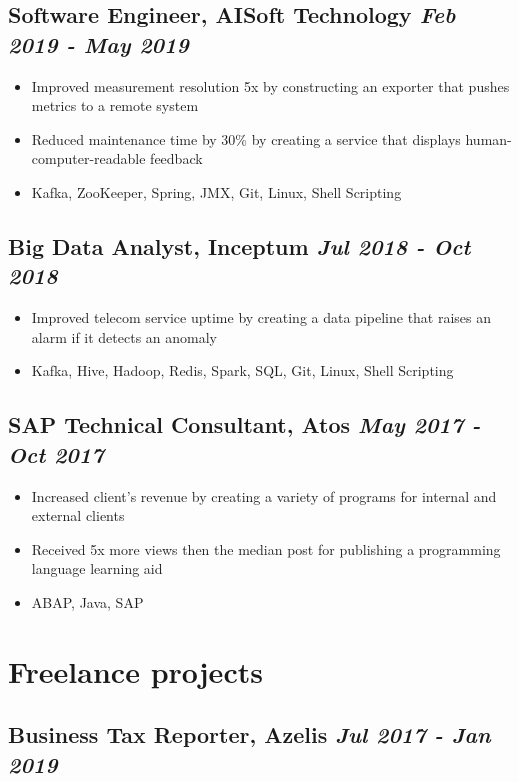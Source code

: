 \documentclass[a4paper]{article}
\newcommand{\bolditalicpair}
[2]
{\textbf{#1} \texorpdfstring{\hfill}{} \textit{#2}}
\begin{document}
\subsection{\bolditalicpair{Software Engineer, AISoft Technology}{Feb 2019 - May 2019}}

\begin{itemize}
  \item Improved measurement resolution 5x by constructing an exporter that pushes metrics to a remote system
  \item Reduced maintenance time by 30\% by creating a service that displays human-computer-readable feedback
  \item Kafka, ZooKeeper, Spring, JMX, Git, Linux, Shell Scripting
\end{itemize}

\subsection{\bolditalicpair{Big Data Analyst, Inceptum}{Jul 2018 - Oct 2018}}

\begin{itemize}
  \item Improved telecom service uptime by creating a data pipeline that raises an alarm if it detects an anomaly
  \item Kafka, Hive, Hadoop, Redis, Spark, SQL, Git, Linux, Shell Scripting
\end{itemize}

\subsection{\bolditalicpair{SAP Technical Consultant, Atos}{May 2017 - Oct 2017}}

\begin{itemize}
  \item Increased client's revenue by creating a variety of programs for internal and external clients
  \item Received 5x more views then the median post for publishing a programming language learning aid
  \item ABAP, Java, SAP
\end{itemize}



\section{Freelance projects}
\subsection{\bolditalicpair{Business Tax Reporter, Azelis}{Jul 2017 - Jan 2019}}
\end{document}
